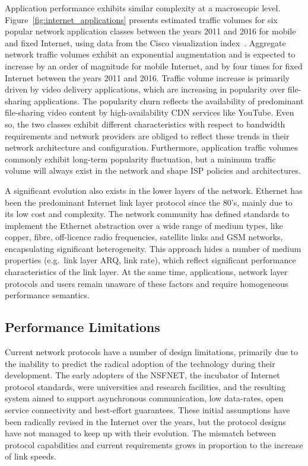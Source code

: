 Application performance exhibits similar complexity at a macroscopic level.
Figure~\ref{fig:internet_applications} presents estimated traffic volumes for
six popular network application classes between the years 2011 and 2016 for mobile
and fixed Internet, using data from the Cisco visualization
index~. Aggregate network traffic volumes
exhibit an exponential augmentation and is expected to increase by an order of
magnitude for mobile Internet, and by four times for fixed Internet between the
years 2011 and 2016. Traffic volume increase is primarily driven by video
delivery applications, which are increasing in popularity over file-sharing
applications. The popularity churn reflects the availability of predominant
file-sharing video content by high-availability CDN services like YouTube.
Even so, the two classes exhibit different characteristics with respect to
bandwidth requirements and network providers are obliged to reflect these
trends in their network architecture and configuration. Furthermore,
application traffic volumes commonly exhibit long-term popularity fluctuation,
but a minimum traffic volume will always exist in the network and shape ISP
policies and architectures. 

A significant evolution also exists in the lower layers of the network.
Ethernet has been the predominant Internet link layer protocol since the 80's,
mainly due to its low cost and complexity. The network community has defined
standards to implement the Ethernet abstraction over a wide range of medium
types, like copper, fibre, off-licence radio frequencies, satellite links and
GSM networks, encapsulating significant heterogeneity. This approach hides a
number of medium properties (e.g.~link layer ARQ, link rate), which reflect
significant performance characteristics of the link layer. At the same time,
applications, network layer protocols and users remain unaware of these factors
and require homogeneous performance semantics. 

\subsection{Performance Limitations}\label{sec:intro:control_limitations}

Current network protocols have a number of design limitations, primarily
due to the inability to predict the radical adoption of the technology during
their development.  The early adopters of the NSFNET, the incubator  of
Internet protocol standards, were universities and research facilities, and the
resulting system aimed to support asynchronous communication, low data-rates,
open service connectivity and best-effort guarantees. These initial assumptions
have been radically revised in the Internet over the years, but the protocol
designs have not managed to keep up with their evolution. The mismatch between
protocol capabilities and current requirements grows in proportion to the
increase of link speeds.

